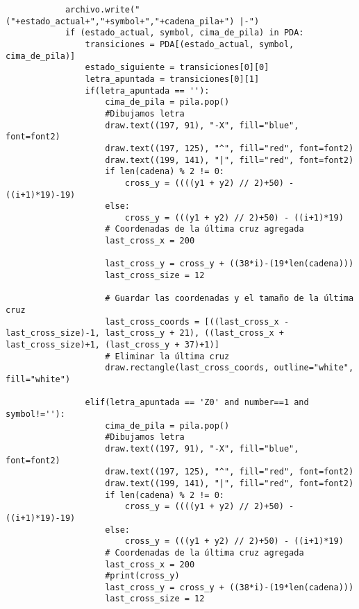 \begin{enumerate}
\begin{lstlisting}
            archivo.write("("+estado_actual+","+symbol+","+cadena_pila+") |-")
            if (estado_actual, symbol, cima_de_pila) in PDA:
                transiciones = PDA[(estado_actual, symbol, cima_de_pila)]
                estado_siguiente = transiciones[0][0]  
                letra_apuntada = transiciones[0][1]
                if(letra_apuntada == ''):
                    cima_de_pila = pila.pop()
                    #Dibujamos letra
                    draw.text((197, 91), "-X", fill="blue", font=font2)
                    draw.text((197, 125), "^", fill="red", font=font2)
                    draw.text((199, 141), "|", fill="red", font=font2)
                    if len(cadena) % 2 != 0:
                        cross_y = ((((y1 + y2) // 2)+50) - ((i+1)*19)-19)
                    else:
                        cross_y = (((y1 + y2) // 2)+50) - ((i+1)*19)
                    # Coordenadas de la última cruz agregada
                    last_cross_x = 200
                    
                    last_cross_y = cross_y + ((38*i)-(19*len(cadena)))
                    last_cross_size = 12

                    # Guardar las coordenadas y el tamaño de la última cruz
                    last_cross_coords = [((last_cross_x - last_cross_size)-1, last_cross_y + 21), ((last_cross_x + last_cross_size)+1, (last_cross_y + 37)+1)]
                    # Eliminar la última cruz
                    draw.rectangle(last_cross_coords, outline="white", fill="white")
                    
                elif(letra_apuntada == 'Z0' and number==1 and symbol!=''):
                    cima_de_pila = pila.pop()
                    #Dibujamos letra
                    draw.text((197, 91), "-X", fill="blue", font=font2)
                    draw.text((197, 125), "^", fill="red", font=font2)
                    draw.text((199, 141), "|", fill="red", font=font2)
                    if len(cadena) % 2 != 0:
                        cross_y = ((((y1 + y2) // 2)+50) - ((i+1)*19)-19)
                    else:
                        cross_y = (((y1 + y2) // 2)+50) - ((i+1)*19)
                    # Coordenadas de la última cruz agregada
                    last_cross_x = 200
                    #print(cross_y)
                    last_cross_y = cross_y + ((38*i)-(19*len(cadena)))
                    last_cross_size = 12


\end{lstlisting}
\end{enumerate}

